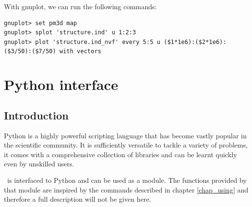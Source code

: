 With gnuplot, we can run the following commands:
\begin{lstlisting}
gnuplot> set pm3d map
gnuplot> splot 'structure.ind' u 1:2:3
gnuplot> plot 'structure.ind_nvf' every 5:5 u ($1*1e6):($2*1e6):($3/50):($7/50) with vectors
\end{lstlisting}


\chapter{Python interface}
\label{ch_python}
\section{Introduction}
Python is a highly powerful scripting language that has become vastly popular in the scientific community. It is sufficiently versatile to tackle a variety of problems, it comes with a comprehensive collection of libraries and can be learnt quickly even by unskilled users.

\afmm\ is interfaced to Python and can be used as a module. The functions provided by that module are inspired by the commands described in chapter \ref{chap_using} and therefore a full description will not be given here.

